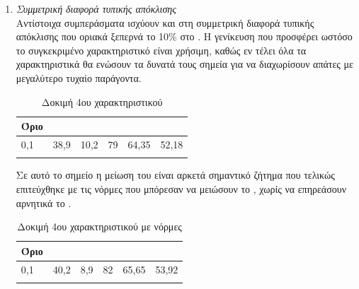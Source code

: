 \begin{enumerate}
\item{\textit{Συμμετρική διαφορά τυπικής απόκλισης}} \\
Αντίστοιχα συμπεράσματα ισχύουν και στη συμμετρική διαφορά τυπικής απόκλισης που οριακά ξεπερνά το 10\% στο . Η γενίκευση που προσφέρει ωστόσο το συγκεκριμένο χαρακτηριστικό είναι χρήσιμη, καθώς εν τέλει όλα τα χαρακτηριστικά θα ενώσουν τα δυνατά τους σημεία για να διαχωρίσουν απάτες με μεγαλύτερο τυχαίο παράγοντα.
\begin{center}
\begin{longtabu} to 0.8\textwidth { | X[c] || X[c] | X[c] | X[c] | X[c] | X[c] |  }
 \hline
  Όριο &   &  &  &  & \\
 ,1&	38,9&	10,2&	79&	64,35&	52,18 \\
\hline
\caption{Δοκιμή 4ου χαρακτηριστικού}
\label{testfeat4}
\end{longtabu}
\end{center}
Σε αυτό το σημείο η μείωση του  είναι αρκετά σημαντικό ζήτημα που τελικώς επιτεύχθηκε με τις νόρμες που μπόρεσαν να μειώσουν το , χωρίς να επηρεάσουν αρνητικά το . 
\begin{center}
\begin{longtabu} to 0.8\textwidth { | X[c] || X[c] | X[c] | X[c] | X[c] | X[c] |  }
 \hline
  Όριο &   &  &  &  & \\
 ,1&	40,2&	8,9&	82&	65,65&	53,92\\
\hline
\caption{Δοκιμή 4ου χαρακτηριστικού με νόρμες}
\label{testfeat4norms}
\end{longtabu}
\end{center}


\end{enumerate}
